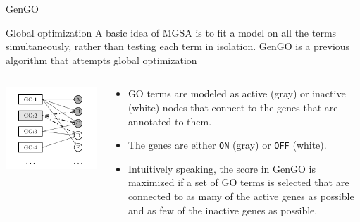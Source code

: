 \documentclass{beamer}
\begin{document}
\begin{frame}{GenGO}
 \begin{mybluebox}{Global optimization}
  A basic idea of MGSA is to fit a model on all the terms simultaneously, rather than testing each term in isolation. GenGO is a previous algorithm that attempts global optimization~\cite{Lu2008}
 \end{mybluebox}

\begin{columns}
\includegraphics[width=1\textwidth]{./img/genGO.png}
\begin{tiny}
\begin{itemize}
\item GO terms are modeled as active (gray) or
inactive (white) nodes that connect to the genes that are annotated to
them. 
\item The genes are either \texttt{ON} (gray) or \texttt{OFF}
(white). 
\item Intuitively speaking, the score in GenGO is maximized if a
set of GO terms is selected that are connected to as many of the
active genes as possible and as few of the inactive genes as possible.                               
\end{itemize}

\end{tiny}

\end{columns}



\end{frame}
\end{document}
